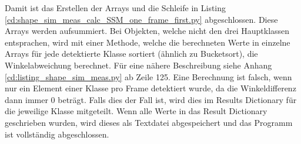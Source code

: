 {	Damit ist das Erstellen der Arrays und die Schleife in Listing \ref{cd:shape_sim_meas_calc_SSM_one_frame_first.py} abgeschlossen. Diese Arrays werden aufsummiert. Bei Objekten, welche nicht den drei Hauptklassen entsprachen, wird mit einer Methode, welche die berechneten Werte in einzelne Arrays für jede detektierte Klasse sortiert (ähnlich zu Bucketsort), die Winkelabweichung berechnet. Für eine nähere Beschreibung siehe Anhang \ref{cd:listing_shape_sim_meas.py} ab Zeile 125. Eine Berechnung ist falsch, wenn nur ein Element einer Klasse pro Frame detektiert wurde, da die Winkeldifferenz dann immer 0 beträgt. Falls dies der Fall ist, wird dies im Results Dictionary für die jeweilige Klasse mitgeteilt.
	Wenn alle Werte in das Result Dictionary geschrieben wurden, wird dieses als Textdatei abgespeichert und das Programm ist vollständig abgeschlossen.


}








